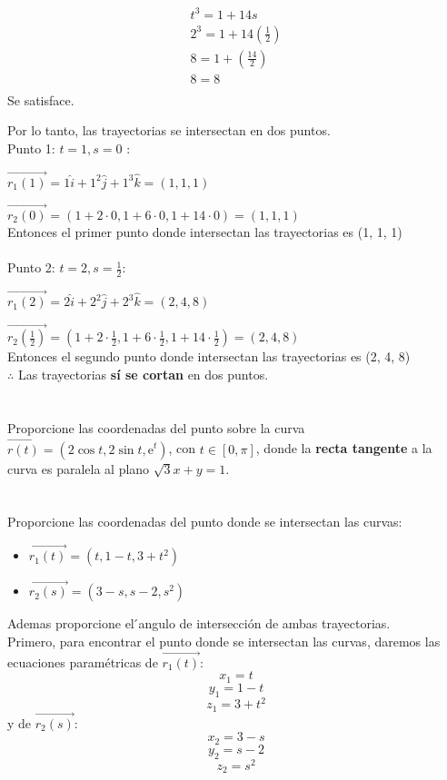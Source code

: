 \documentclass[12pt]{article}
\begin{document}
\begin{align*}
  t^3 =  1+14s \\
  2^3 =  1+14 \left( \frac{1}{2} \right) \\
  8  =  1 + \left(\frac{14}{2} \right) \\
   8  =  8 \\
\end{align*}
Se satisface.

Por lo tanto, las trayectorias se intersectan en dos puntos.\\
Punto 1: $t=1 , s=0$ :
\item $\vec{r_1(1)}=1\hat{i}+1^2\hat{j}+1^3\hat{k} = (1, 1, 1) $

\item $\vec{r_2(0)}=(1+2 \cdot 0,1+6 \cdot 0,1+14 \cdot 0) = (1, 1, 1) $\\
  Entonces el primer punto donde intersectan las trayectorias es (1, 1, 1) \\ \\
 Punto 2: $t=2 , s=\frac{1}{2}$:
  \item $\vec{r_1(2)}=2\hat{i}+2^2\hat{j}+2^3\hat{k} = (2, 4, 8) $

\item $\vec{r_2(\frac{1}{2})}=(1+2 \cdot \frac{1}{2} ,1+6 \cdot \frac{1}{2},1+14 \cdot \frac{1}{2}) = (2, 4, 8) $\\
  Entonces el segundo punto donde intersectan las trayectorias es (2, 4, 8) \\
$ \therefore $ Las trayectorias \textbf{sí se cortan} en dos puntos.
\section{}
Proporcione las coordenadas del punto sobre la curva $\vec{r(t)}=(2\cos{t},2\sin{t},\mathrm{e}^t)$, con $t \in [0,\pi]$, donde la \textbf{recta tangente} a la curva es paralela al plano $\sqrt{3}x+y=1$.

\section{}
Proporcione las coordenadas del punto donde se intersectan las curvas:
\begin{itemize}[format=\textbf]

\item $\vec{r_1(t)}=(t,1-t,3+t^2)$

\item $\vec{r_2(s)}=(3-s,s-2,s^2)$

\end{itemize}
Ademas proporcione el  ́angulo de intersección de ambas trayectorias.\\
Primero, para encontrar el punto donde se intersectan las curvas, daremos las ecuaciones paramétricas de $\vec{r_1(t)}$:
\[ x_1 = t\]
\[ y_1 = 1-t\]
\[ z_1 = 3+t^2\]
y de $\vec{r_2(s)}$:
\[ x_2 = 3-s\]
\[ y_2 = s-2\]
\[ z_2 = s^{2} \]
\end{document}
